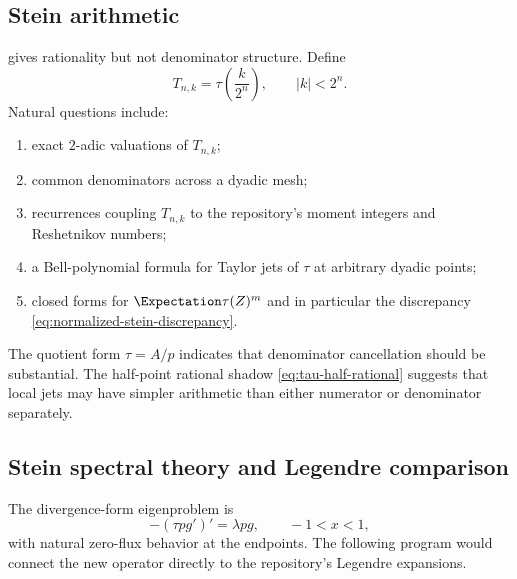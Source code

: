 \documentclass[11pt,oneside]{article}
\theoremstyle{definition}
\theoremstyle{remark}
\begin{document}
\subsection{Stein arithmetic}
 gives rationality but not denominator structure.  Define
\[
 T_{n,k}=\tau\!\left(\frac{k}{2^n}\right),
 \qquad |k|<2^n.
\]
Natural questions include:

\begin{enumerate}
\item exact $2$-adic valuations of $T_{n,k}$;
\item common denominators across a dyadic mesh;
\item recurrences coupling $T_{n,k}$ to the repository's moment integers and
Reshetnikov numbers;
\item a Bell-polynomial formula for Taylor jets of $\tau$ at arbitrary dyadic
points;
\item closed forms for $\Expectation\tau(Z)^m$ and in particular the discrepancy
\eqref{eq:normalized-stein-discrepancy}.
\end{enumerate}

The quotient form $\tau=A/p$ indicates that denominator cancellation should be
substantial.  The half-point rational shadow \eqref{eq:tau-half-rational} suggests
that local jets may have simpler arithmetic than either numerator or denominator
separately.

\subsection{Stein spectral theory and Legendre comparison}
The divergence-form eigenproblem is
\begin{equation}\label{eq:sturm-liouville}
 -(\tau p g')'=\lambda p g,
 \qquad -1<x<1,
\end{equation}
with natural zero-flux behavior at the endpoints.  The following program would
connect the new operator directly to the repository's Legendre expansions.
\end{document}
